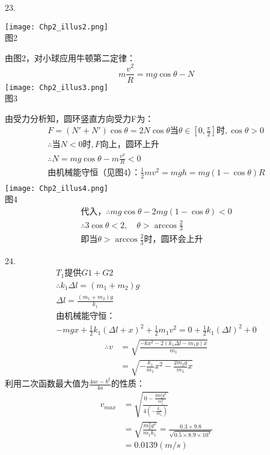 \documentclass[a4paper,fleqn,twocolumn]{article}
\begin{document}
   		23.\par
   		\centering\texttt{[image: Chp2\_illus2.png]}\\
   		图2\\
   		\raggedright 由图2，对小球应用牛顿第二定律：
   		\[m\frac{v^2}{R}=mg\cos\theta-N\]
		\centering\texttt{[image: Chp2\_illus3.png]}\\
		图3\\
		\raggedright 由受力分析知，圆环竖直方向受力F为：
   		\begin{gather*}
   			F=(N'+N')\cos\theta=2N\cos\theta
   			\text{当}\theta\in[0,\frac{\pi}{2}]\text{时},\cos\theta>0\\
   			\therefore\text{当}N<0\text{时},F\text{向上，圆环上升}\\
   			\therefore N=mg\cos\theta-m\frac{v^2}{R}<0\\
   			\text{由机械能守恒（见图4）：}\frac{1}{2}mv^2=mgh=mg(1-\cos\theta)R\\
   		\end{gather*}
   		\centering\texttt{[image: Chp2\_illus4.png]}\\
   		图4
   		\begin{gather*}
   			\text{代入，}\therefore mg\cos\theta-2mg(1-\cos\theta)<0\\
   			\therefore 3\cos\theta<2,\quad \theta>\arccos\frac{2}{3}\\
   			\text{即当}\theta>\arccos\frac{2}{3}\text{时，圆环会上升}
   		\end{gather*}
   		\raggedright
   		24.
   		\begin{gather*}
	   		T_1\text{提供}G1+G2\\
	   		\therefore k_1\Delta l=(m_1+m_2)g\\
	   		\Delta l=\frac{(m_1+m_2)g}{k_1}\\
	   		\text{由机械能守恒：}\\
	   		-mgx+\frac{1}{2}k_1(\Delta l+x)^2+\frac{1}{2}m_1v^2=0+\frac{1}{2}k_1(\Delta l)^2+0
	   	\end{gather*}
	   	\begin{align*}
	   		\therefore v&=\sqrt{\frac{-kx^2-2(k_1\Delta l-m_1g)x}{m_1}}\\
	   					&=\sqrt{-\frac{k_1}{m_1}x^2-\frac{2m_2g}{m_1}x}
	   	\end{align*}
	   	利用二次函数最大值为$\frac{4ac-b^2}{4a}$的性质：
	   	\begin{align*}
	   		v_{max}	&=\sqrt{\frac{0-\frac{4m_2^2g^2}{m_1^2}}{4\left(-\frac{k_1}{m_1}\right)}}\\
	   				&=\sqrt{\frac{m_2^2g^2}{m_1k_1}}=\frac{0.3\times 9.8}{\sqrt{0.5\times 8.9\times 10^4}}\\
	   				&=0.0139(m/s)
   		\end{align*}
\end{document}
